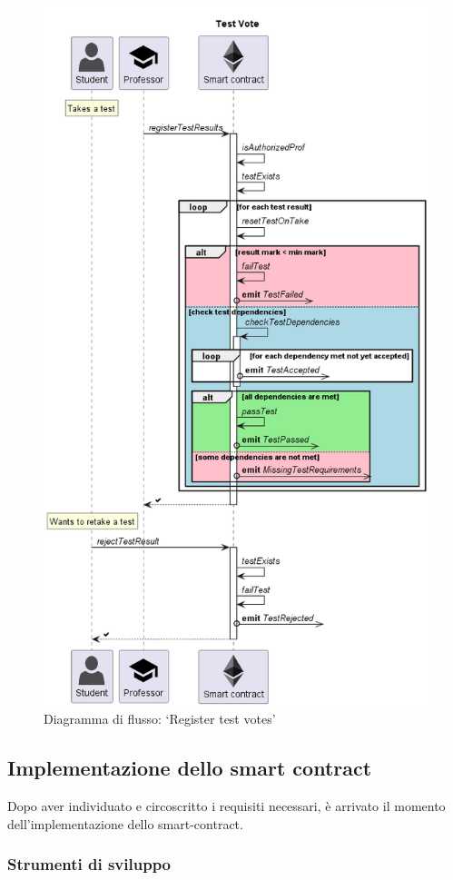 \begin{figure}
    \centering
    \includegraphics[width=0.75\columnwidth]{img/TestVote.png}
    \caption{Diagramma di flusso: `Register test votes'}
    \label{fig:registerTestVotes}
\end{figure}

\subsection{Implementazione dello smart contract}

Dopo aver individuato e circoscritto i requisiti necessari, è arrivato il momento dell'implementazione dello \gls{smart-contract}.

\subsubsection{Strumenti di sviluppo}


